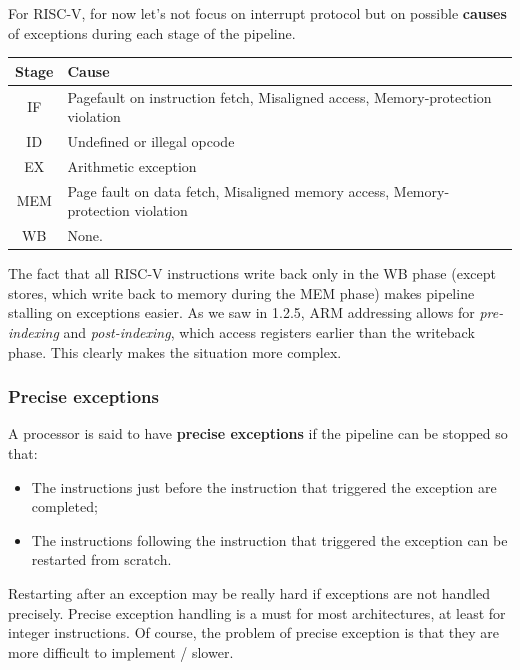\documentclass[a4paper,11pt]{article}
\begin{document}
For RISC-V, for now let's not focus on interrupt protocol but on possible \textbf{causes} of exceptions during each stage of the pipeline.
\begin{table}[h!]
	\center {}
	\begin{tabular} { c | p{10cm} }
		\bfseries Stage & \bfseries Cause                                                                 \\
		\hline
		IF              & Pagefault on instruction fetch, Misaligned access, Memory-protection violation  \\
		ID              & Undefined or illegal opcode                                                     \\
		EX              & Arithmetic exception                                                            \\
		MEM             & Page fault on data fetch, Misaligned memory access, Memory-protection violation \\
		WB              & None.
	\end{tabular}
\end{table}

The fact that all RISC-V instructions write back only in the WB phase (except stores, which write back to memory during the MEM phase) makes pipeline stalling on exceptions easier.
As we saw in 1.2.5, ARM addressing allows for \textit{pre-indexing} and \textit{post-indexing}, which access registers earlier than the writeback phase.
This clearly makes the situation more complex.

\subsubsection{Precise exceptions}

A processor is said to have \textbf{precise exceptions} if the pipeline can be stopped so that:
\begin{itemize}
	\item The instructions just before the instruction that triggered the exception are completed;
	\item The instructions following the instruction that triggered the exception can be restarted from scratch.
\end{itemize}

Restarting after an exception may be really hard if exceptions are not handled precisely.
Precise exception handling is a must for most architectures, at least for integer instructions.
Of course, the problem of precise exception is that they are more difficult to implement / slower.
\end{document}
